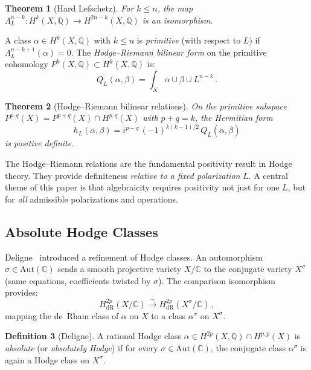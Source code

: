 \documentclass[aps,prd,twocolumn,superscriptaddress,nofootinbib]{revtex4-2}
\newtheorem{theorem}{Theorem}[section]
\theoremstyle{definition}
\newtheorem{definition}[theorem]{Definition}
\theoremstyle{remark}
\begin{document}
\begin{theorem}[Hard Lefschetz]
\label{thm:hard_lefschetz}
For $k \leq n$, the map $\Lambda_L^{n-k}: H^k(X, \mathbb{Q}) \to H^{2n-k}(X, \mathbb{Q})$ is an isomorphism.
\end{theorem}

A class $\alpha \in H^k(X, \mathbb{Q})$ with $k \leq n$ is \textit{primitive} (with respect to $L$) if $\Lambda_L^{n-k+1}(\alpha) = 0$. The \textit{Hodge--Riemann bilinear form} on the primitive cohomology $P^k(X, \mathbb{Q}) \subset H^k(X, \mathbb{Q})$ is:
\begin{equation}
Q_L(\alpha, \beta) = \int_X \alpha \cup \beta \cup L^{n-k}\,.
\label{eq:HR_form}
\end{equation}

\begin{theorem}[Hodge--Riemann bilinear relations]
\label{thm:HR}
On the primitive subspace $P^{p,q}(X) = P^{p+q}(X) \cap H^{p,q}(X)$ with $p + q = k$, the Hermitian form
\begin{equation}
h_L(\alpha, \beta) = i^{p-q}\,(-1)^{k(k-1)/2}\, Q_L(\alpha, \bar{\beta})
\label{eq:HR_hermitian}
\end{equation}
is positive definite.
\end{theorem}

The Hodge--Riemann relations are the fundamental positivity result in Hodge theory. They provide definiteness \textit{relative to a fixed polarization} $L$. A central theme of this paper is that algebraicity requires positivity not just for one $L$, but for \textit{all} admissible polarizations and operations.

\subsection{Absolute Hodge Classes}

Deligne~\cite{Deligne1982} introduced a refinement of Hodge classes. An automorphism $\sigma \in \mathrm{Aut}(\mathbb{C})$ sends a smooth projective variety $X/\mathbb{C}$ to the conjugate variety $X^\sigma$ (same equations, coefficients twisted by $\sigma$). The comparison isomorphism provides:
\begin{equation}
H^{2p}_{\mathrm{dR}}(X/\mathbb{C}) \xrightarrow{\sim} H^{2p}_{\mathrm{dR}}(X^\sigma/\mathbb{C})\,,
\end{equation}
mapping the de~Rham class of $\alpha$ on $X$ to a class $\alpha^\sigma$ on $X^\sigma$.

\begin{definition}[Deligne]
\label{def:absolute}
A rational Hodge class $\alpha \in H^{2p}(X, \mathbb{Q}) \cap H^{p,p}(X)$ is \textit{absolute} (or \textit{absolutely Hodge}) if for every $\sigma \in \mathrm{Aut}(\mathbb{C})$, the conjugate class $\alpha^\sigma$ is again a Hodge class on $X^\sigma$.
\end{definition}
\end{document}
